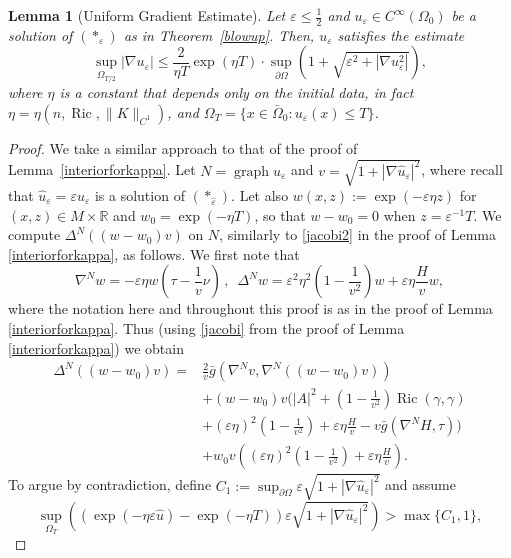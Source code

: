 \documentclass[11pt]{amsart}
\newtheorem{Lemma}[Theorem]{Lemma}
\renewcommand{\epsilon}{\varepsilon}
\DeclareMathOperator{\graph}{graph} \DeclareMathOperator{\closure}{Closure}
\DeclareMathOperator{\Ric}{Ric}    \DeclareMathOperator{\Rm}{Rm}
\def\R{\mathbb{R}}
\def\e{\epsilon}
\begin{document}
 
\begin{Lemma}[Uniform Gradient Estimate]\label{unigradest} Let $\e\le \frac12$ and $u_\e\in C^\infty(\Omega_0)$ be a solution  of $(*_{\varepsilon})$  as  in  Theorem~\ref{blowup}. Then, $u_\e$  satisfies the estimate
\begin{equation*}
\sup_{\Omega_{T/2}}|\nabla u_{\varepsilon}|\leq \frac{2}{\eta T}\exp(\eta T)\cdot\sup_{\partial\Omega}(1+\sqrt{\varepsilon^2+|\nabla u_{\varepsilon}^2|}),
\end{equation*}
where $\eta$ is a constant that depends only on the initial data, in fact $\eta=\eta(n,\Ric,\|K\|_{C^1})$, and $\Omega_T=\{x\in\bar{\Omega}_0:u_{\varepsilon}(x)\leq T\}$.
\end{Lemma}
\begin{proof} We take a similar approach to that of the proof of Lemma~\ref{interiorforkappa}. Let $N=\graph \hat u_\e$ and $v=\sqrt{1+|\nabla \hat u_\e|^2}$, where recall that $\hat u_\e=\e u_\e$ is a solution of $(*_{\hat{\varepsilon}})$. Let also $w(x,z):=\exp(-\varepsilon\eta z)$ for $(x,z)\in M\times\R$ and $w_0=\exp(-\eta T)$, so that $w-w_0=0$ when $z=\e^{-1}T$. We compute $\Delta^N((w-w_0)v)$ on $N$, similarly to \eqref{jacobi2} in the proof of Lemma  \ref{interiorforkappa}, as follows. We first note that
\[
\nabla^N w=-\e\eta w\left(\tau-\frac1v\nu\right)\,,\,\,\,\Delta^N w=\e^2\eta^2\left(1-\frac{1}{v^2}\right)w+\e\eta\frac{H}{v}w,
\]
where the notation here and throughout this proof is as in the proof of Lemma  \ref{interiorforkappa}. Thus (using \eqref{jacobi} from the proof of Lemma  \ref{interiorforkappa}) we obtain
\begin{equation}\label{newJacobiEqn}
\begin{split}
\Delta^N((w-w_0)v)=&\frac{2}{v}\bar g(\nabla^Nv,\nabla^N((w-w_0)v))
\\
&+(w-w_0)v\Bigg(|A|^2+\left(1-\frac{1}{v^2}\right)\Ric(\gamma,\gamma)\\
&+(\varepsilon\eta)^2\left(1-\frac{1}{v^2}\right)+\varepsilon\eta\frac{H}{v}-v\bar g(\nabla^NH,\tau)\Bigg)\\
&+w_0v\left((\varepsilon\eta)^2\left(1-\frac{1}{v^2}\right)+\varepsilon\eta\frac{H}{v}\right).
\end{split}
\end{equation}
To argue by contradiction, define $C_1:=\sup_{\partial\Omega}\varepsilon\sqrt{1+|\nabla \hat{u}_\e|^2}$ and assume 
\begin{equation}\label{contradiction}
\sup_{\Omega_T}((\exp(-\eta \varepsilon\hat{u})-\exp(-\eta T))\varepsilon\sqrt{1+|\nabla \hat{u}_\e|^2})>\max\{C_1,1\},

\end{equation}
\end{proof}
\end{document}
